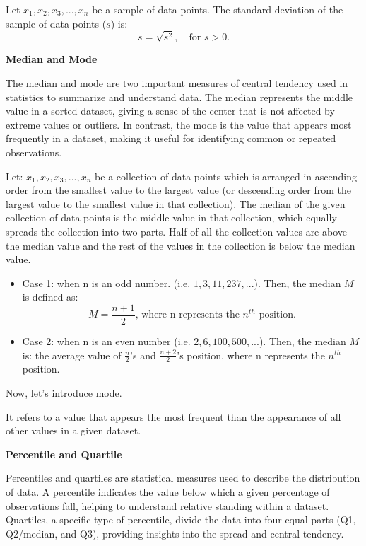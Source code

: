 \begin{definition}
Let $x_1, x_2, x_3, ..., x_n$ be a sample of data points. The standard deviation of the sample of data points ($s$) is: \[ s = \sqrt{s^2}, \quad \text{for } s > 0.\]
\end{definition}

\textbf{Median and Mode}

The median and mode are two important measures of central tendency used in statistics to summarize and understand data. The median represents the middle value in a sorted dataset, giving a sense of the center that is not affected by extreme values or outliers. In contrast, the mode is the value that appears most frequently in a dataset, making it useful for identifying common or repeated observations.

\begin{definition}[Median]
Let: $x_1, x_2, x_3, ... , x_n$ be a collection of data points which is arranged in ascending order from the smallest value to the largest value (or descending order from the largest value to the smallest value in that collection). The median of the given collection of data points is the middle value in that collection, which equally spreads the collection into two parts. Half of all the collection values are above the median value and the rest of the values in the collection is below the median value.
\begin{itemize}
 \item Case 1: when n is an odd number. (i.e. $1, 3, 11, 237,...$). Then, the median $M$ is defined as: \[ M = \frac{n+1}{2} \text{, where n represents the $n^{th}$ position}.\]
 \item Case 2: when n is an even number (i.e. $2, 6, 100, 500,...$). Then, the median $M$ is: the average value of $\frac{n}{2}$'s and $\frac{n+2}{2}$'s position, where n represents the $n^{th}$ position.
 \end{itemize}
\end{definition}

Now, let's introduce mode. 

\begin{definition}[Mode]
It refers to a value that appears the most frequent than the appearance of all other values in a given dataset.
\end{definition}

\textbf{Percentile and Quartile}

Percentiles and quartiles are statistical measures used to describe the distribution of data. A percentile indicates the value below which a given percentage of observations fall, helping to understand relative standing within a dataset. Quartiles, a specific type of percentile, divide the data into four equal parts (Q1, Q2/median, and Q3), providing insights into the spread and central tendency.

